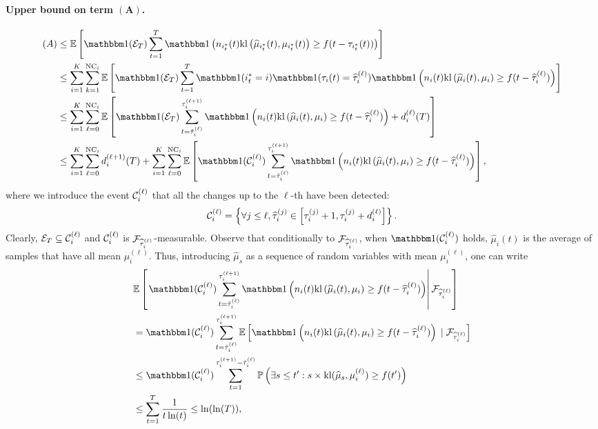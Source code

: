 \paragraph{Upper bound on term $\bm{(A)}$.}
%
\begin{align*}
    (A) & \leq \bE\left[\indic(\cE_T) \sum_{t=1}^T \indic\left(n_{i_t^*}(t) \kl\left(\widehat{\mu}_{i_t^*}(t), \mu_{i_t^*}(t)\right) \geq f(t - \tau_{i_t^*}(t))\right)\right] \\
    & \leq \sum_{i=1}^K \sum_{k=1}^{\NCi}\bE\left[\indic(\cE_T) \sum_{t=1}^T \indic(i_t^* =i) \indic(\tau_i(t) = \widehat{\tau}_i^{(\ell)})\indic\left(n_{i}(t) \kl\left(\widehat{\mu}_{i}(t), \mu_{i}\right) \geq f(t - \widehat{\tau}_{i}^{(\ell)})\right)\right] \\
    & \leq \sum_{i=1}^K \sum_{\ell=0}^{\NCi}\bE\left[\indic(\cE_T) \sum_{t=\hat{\tau}_i^{(\ell)}}^{\tau_i^{(\ell+1)}} \indic\left(n_{i}(t) \kl\left(\widehat{\mu}_{i}(t), \mu_{i}\right) \geq f(t - \widehat{\tau}_{i}^{(\ell)})\right) + d_i^{(\ell)}(T)\right] \\
    & \leq \sum_{i=1}^K \sum_{\ell=0}^{\NCi}d_i^{(\ell+1)}(T) + \sum_{i=1}^K \sum_{\ell=0}^{\NCi}\bE\left[\indic(\cC_i^{(\ell)}) \sum_{t=\hat{\tau}_i^{(\ell)}}^{\tau_i^{(\ell+1)}}\indic\left(n_{i}(t) \kl\left(\widehat{\mu}_{i}(t), \mu_{i}\right) \geq f(t - \widehat{\tau}_{i}^{(\ell)})\right)\right],
\end{align*}%
%
where we introduce the event $\mathcal{C}_i^{(\ell)}$ that all the changes up to the $\ell$-th have been detected:
\begin{equation}\mathcal{C}_i^{(\ell)} = \left\{\forall j \leq \ell, \widehat{\tau}_i^{(j)} \in \left[\tau_i^{(j)} + 1, \tau_i^{(j)} + d_i^{(\ell)} \right] \right\}.\label{def:6:EventCi}\end{equation}
Clearly, $\mathcal{E}_T \subseteq \mathcal{C}_i^{(\ell)}$ and $\mathcal{C}_i^{(\ell)}$ is $\mathcal{F}_{\widehat{\tau}_i^{(\ell)}}$-measurable. Observe that conditionally to $\mathcal{F}_{\widehat{\tau}_i^{(\ell)}}$, when $\indic(\cC_i^{(\ell)})$ holds, $\widehat{\mu}_{i}(t)$ is the average of samples that have all mean $\mu_i^{(\ell)}$. Thus, introducing $\widehat{\mu}_s$ as a sequence of \iid{} random variables with mean $\mu_i^{(\ell)}$, one can write
\begin{align*}
    &\bE\left[\left.\indic(\cC_i^{(\ell)}) \sum_{t=\hat{\tau}_i^{(\ell)}}^{\tau_i^{(\ell+1)}} \indic\left(n_{i}(t) \kl\left(\widehat{\mu}_{i}(t), \mu_{i}\right) \geq f(t - \widehat{\tau}_{i}^{(\ell)})\right) \right| \cF_{\widehat{\tau}_i^{(\ell)}}\right]\\
    & = \indic(\cC_i^{(\ell)}) \sum_{t=\hat{\tau}_i^{(\ell)}}^{\tau_i^{(\ell+1)}} \bE\left[\indic\left(n_{i}(t) \kl\left(\widehat{\mu}_{i}(t), \mu_{i}\right) \geq f(t - \widehat{\tau}_{i}^{(\ell)})\right) \;|\; \cF_{\widehat{\tau}_i^{(\ell)}}\right] \\
    & \leq \indic(\cC_i^{(\ell)}) \sum_{t=1}^{\tau_i^{(\ell+1)} - \hat{\tau}_i^{(\ell)}} \bP\left(\exists s \leq t' : s \times \kl(\widehat{\mu}_{s},\mu_i^{(\ell)}) \geq f(t')\right) \\
    & \leq \sum_{t=1}^T \frac{1}{t\ln(t)} \leq \ln(\ln(T)),
\end{align*}%
